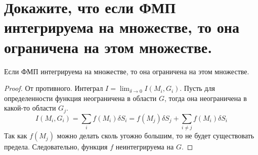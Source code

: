 \section{Докажите, что если ФМП интегрируема на множестве, то она ограничена на этом множестве.}
\begin{theorem}
    Если ФМП интегрируема на множестве, то она ограничена на этом множестве.
    \begin{proof}
        От противного.
        Интеграл 
        $I = \lim_{\delta \to 0} I(M_i, G_i)$.
        Пусть для определенности функция неограничена в области
        $G$,
        тогда она неограничена в какой-то области
        $G_j$.
        \[
            I(M_i, G_i) =
            \sum_i f(M_i) \delta S_i = f(M_j) \delta S_j + \sum_{i \neq j} f(M_i) \delta S_i
        \]
        Так как $f(M_j)$ можно делать сколь угожно большим, то не будет существовать предела. Следовательно, функция $f$ неинтегрируема на $G$.
    \end{proof}
\end{theorem}
